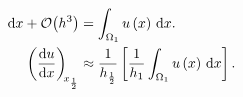 \begin{align}
	\dl x+
	\mathcal{O}\big(h^{3}\big)     & =
	\int_{\Omega_{1}}
	u\left(x\right)
	\dl x.\notag                             \\
	\diff{u}{x}[x_{\frac{1}{2}}]   & \approx
	\frac{1}{h_{\frac{1}{2}}}
	\left[
		\frac{1}{h_{1}}
		\int_{\Omega_{1}}
		u\left(x\right)
		\dl x
		\right].\notag
\end{align}


